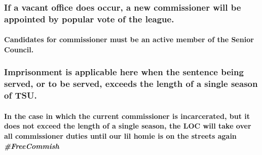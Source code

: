 \documentclass[
]{book}
\begin{document}
\hypertarget{if-a-vacant-office-does-occur-a-new-commissioner-will-be-appointed-by-popular-vote-of-the-league.}{%
\subsubsection{If a vacant office does occur, a new commissioner will be appointed by popular vote of the league.}\label{if-a-vacant-office-does-occur-a-new-commissioner-will-be-appointed-by-popular-vote-of-the-league.}}

\hypertarget{candidates-for-commissioner-must-be-an-active-member-of-the-senior-council.}{%
\paragraph{Candidates for commissioner must be an active member of the Senior Council.}\label{candidates-for-commissioner-must-be-an-active-member-of-the-senior-council.}}

\hypertarget{imprisonment-is-applicable-here-when-the-sentence-being-served-or-to-be-served-exceeds-the-length-of-a-single-season-of-tsu.}{%
\subsubsection{Imprisonment is applicable here when the sentence being served, or to be served, exceeds the length of a single season of TSU.}\label{imprisonment-is-applicable-here-when-the-sentence-being-served-or-to-be-served-exceeds-the-length-of-a-single-season-of-tsu.}}

\hypertarget{in-the-case-in-which-the-current-commissioner-is-incarcerated-but-it-does-not-exceed-the-length-of-a-single-season-the-loc-will-take-over-all-commissioner-duties-until-our-lil-homie-is-on-the-streets-again-freecommish}{%
\paragraph{\texorpdfstring{In the case in which the current commissioner is incarcerated, but it does not exceed the length of a single season, the LOC will take over all commissioner duties until our lil homie is on the streets again \emph{\#FreeCommish}}{In the case in which the current commissioner is incarcerated, but it does not exceed the length of a single season, the LOC will take over all commissioner duties until our lil homie is on the streets again \#FreeCommish}}\label{in-the-case-in-which-the-current-commissioner-is-incarcerated-but-it-does-not-exceed-the-length-of-a-single-season-the-loc-will-take-over-all-commissioner-duties-until-our-lil-homie-is-on-the-streets-again-freecommish}}
\end{document}
